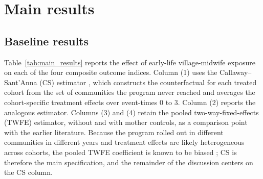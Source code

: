 
\section{Main results} \label{sec:results}

\subsection{Baseline results}

Table~\ref{tab:main_results} reports the effect of early-life village-midwife exposure on each of the four composite outcome indices. Column (1) uses the Callaway--Sant'Anna (CS) estimator \autocite{callawaysantanna2021}, which constructs the counterfactual for each treated cohort from the set of communities the program never reached and averages the cohort-specific treatment effects over event-times 0 to 3. Column (2) reports the analogous \textcite{dechaisemartin2021} estimator. Columns (3) and (4) retain the pooled two-way-fixed-effects (TWFE) estimator, without and with mother controls, as a comparison point with the earlier literature. Because the program rolled out in different communities in different years and treatment effects are likely heterogeneous across cohorts, the pooled TWFE coefficient is known to be biased \autocite{goodmanbacon2021}; CS is therefore the main specification, and the remainder of the discussion centers on the CS column.

